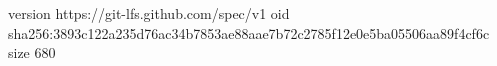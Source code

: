 version https://git-lfs.github.com/spec/v1
oid sha256:3893c122a235d76ac34b7853ae88aae7b72c2785f12e0e5ba05506aa89f4cf6c
size 680
